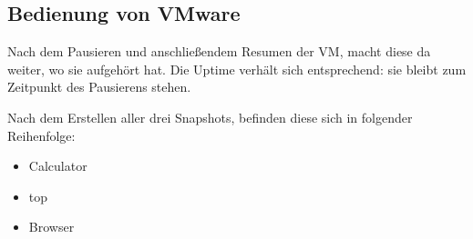 \documentclass[12pt,a4paper]{article}
\begin{document}
\subsection{Bedienung von VMware}
    Nach dem Pausieren und anschließendem Resumen der VM, macht diese da weiter,
    wo sie aufgehört hat. Die Uptime verhält sich entsprechend: sie bleibt zum
    Zeitpunkt des Pausierens stehen.

    Nach dem Erstellen aller drei Snapshots, befinden diese sich in folgender Reihenfolge:
    \begin{itemize}
        \item Calculator
        \item top
        \item Browser
    \end{itemize}  
\end{document}
